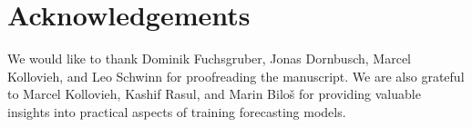 \section*{Acknowledgements}

We would like to thank Dominik Fuchsgruber, Jonas Dornbusch, Marcel Kollovieh, and Leo Schwinn for proofreading the manuscript.
We are also grateful to Marcel Kollovieh, Kashif Rasul, and Marin Bilo\v{s} for providing valuable insights into practical aspects of training forecasting models.